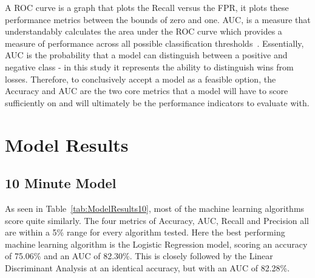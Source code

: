 A \ac{ROC} curve is a graph that plots the Recall versus the \ac{FPR}, it plots these performance metrics between the bounds of zero and one.
\ac{AUC}, is a measure that understandably calculates the area under the \ac{ROC} curve which provides a measure of performance across all possible classification thresholds~\citep{aucGoogle}.
Essentially, \ac{AUC} is the probability that a model can distinguish between a positive and negative class - in this study it represents the ability to distinguish wins from losses.
Therefore, to conclusively accept a model as a feasible option, the Accuracy and AUC are the two core metrics that a model will have to score sufficiently on and will ultimately be the performance indicators to evaluate with. \\


\section{Model Results}\label{sec:Model Results}
\subsection{10 Minute Model}\label{subsec:10-minute-model}


As seen in Table~\ref{tab:ModelResults10}, most of the machine learning algorithms score quite similarly.
The four metrics of Accuracy, AUC, Recall and Precision all are within a 5\% range for every algorithm tested.
Here the best performing machine learning algorithm is the Logistic Regression model, scoring an accuracy of 75.06\% and an AUC of 82.30\%.
This is closely followed by the Linear Discriminant Analysis at an identical accuracy, but with an AUC of 82.28\%. \\

